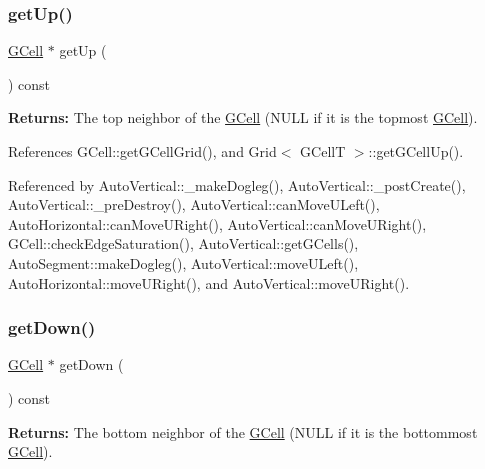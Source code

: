 \mbox{\label{classKatabatic_1_1GCell_a335506a314a2330b5a354906e798e60c}} 
\subsubsection{\texorpdfstring{get\+Up()}{getUp()}}
{\footnotesize\ttfamily \mbox{\hyperlink{classKatabatic_1_1GCell}{G\+Cell}} $\ast$ get\+Up (\begin{DoxyParamCaption}{ }\end{DoxyParamCaption}) const}

{\bfseries Returns\+:} The top neighbor of the \mbox{\hyperlink{classKatabatic_1_1GCell}{G\+Cell}} ({\ttfamily N\+U\+LL} if it is the topmost \mbox{\hyperlink{classKatabatic_1_1GCell}{G\+Cell}}). 

References G\+Cell\+::get\+G\+Cell\+Grid(), and Grid$<$ G\+Cell\+T $>$\+::get\+G\+Cell\+Up().



Referenced by Auto\+Vertical\+::\+\_\+make\+Dogleg(), Auto\+Vertical\+::\+\_\+post\+Create(), Auto\+Vertical\+::\+\_\+pre\+Destroy(), Auto\+Vertical\+::can\+Move\+U\+Left(), Auto\+Horizontal\+::can\+Move\+U\+Right(), Auto\+Vertical\+::can\+Move\+U\+Right(), G\+Cell\+::check\+Edge\+Saturation(), Auto\+Vertical\+::get\+G\+Cells(), Auto\+Segment\+::make\+Dogleg(), Auto\+Vertical\+::move\+U\+Left(), Auto\+Horizontal\+::move\+U\+Right(), and Auto\+Vertical\+::move\+U\+Right().

\mbox{\label{classKatabatic_1_1GCell_ae448c9d6d028e967d7bd5a1bfdd05311}} 
\subsubsection{\texorpdfstring{get\+Down()}{getDown()}}
{\footnotesize\ttfamily \mbox{\hyperlink{classKatabatic_1_1GCell}{G\+Cell}} $\ast$ get\+Down (\begin{DoxyParamCaption}{ }\end{DoxyParamCaption}) const}

{\bfseries Returns\+:} The bottom neighbor of the \mbox{\hyperlink{classKatabatic_1_1GCell}{G\+Cell}} ({\ttfamily N\+U\+LL} if it is the bottommost \mbox{\hyperlink{classKatabatic_1_1GCell}{G\+Cell}}). 

